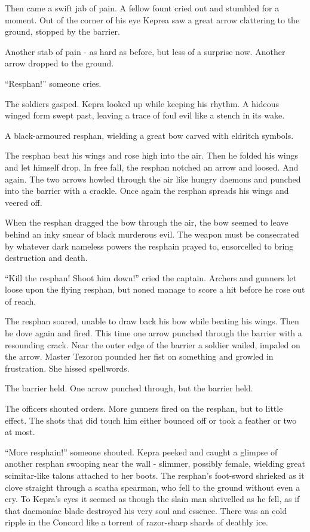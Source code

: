 \documentclass
  [a4paper,
   12pt,
   oneside
  ]%
  {article}
\begin{document}
Then came a swift jab of pain. A fellow fount cried out and stumbled for a moment. Out of the corner of his eye Keprea saw a great arrow clattering to the ground, stopped by the barrier. 

Another stab of pain - as hard as before, but less of a surprise now. Another arrow dropped to the ground.

``Resphan!'' someone cries. 

The soldiers gasped. Kepra looked up while keeping his rhythm. A hideous winged form swept past, leaving a trace of foul evil like a stench in its wake. 

A black-armoured resphan, wielding a great bow carved with eldritch symbols. 

The resphan beat his wings and rose high into the air. Then he folded his wings and let himself drop. In free fall, the resphan notched an arrow and loosed. And again. The two arrows howled through the air like hungry daemons and punched into the barrier with a crackle. Once again the resphan spreads his wings and veered off.

When the resphan dragged the bow through the air, the bow seemed to leave behind an inky smear of black murderous evil. 
The weapon must be consecrated by whatever dark nameless powers the resphain prayed to, ensorcelled to bring destruction and death.

``Kill the resphan! Shoot him down!'' cried the captain. Archers and gunners let loose upon the flying resphan, but noned manage to score a hit before he rose out of reach. 

The resphan soared, unable to draw back his bow while beating his wings. 
Then he dove again and fired. This time one arrow punched through the barrier with a resounding crack. 
Near the outer edge of the barrier a soldier wailed, impaled on the arrow. Master Tezoron pounded her fist on something and growled in frustration. She hissed spellwords. 

The barrier held. One arrow punched through, but the barrier held. 

The officers shouted orders. More gunners fired on the resphan, but to little effect. The shots that did touch him either bounced off or took a feather or two at most.

``More resphain!'' someone shouted. Kepra peeked and caught a glimpse of another resphan swooping near the wall - slimmer, possibly female, wielding great scimitar-like talons attached to her boots.
The resphan’s foot-sword shrieked as it clove straight through a scatha spearman, who fell to the ground without even a cry. 
To Kepra’s eyes it seemed as though the slain man shrivelled as he fell, as if that daemoniac blade destroyed his very soul and essence. There was an cold ripple in the Concord like a torrent of razor-sharp shards of deathly ice. 
\end{document}
